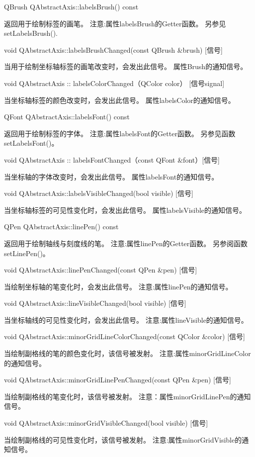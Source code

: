 QBrush QAbstractAxis::labelsBrush() const 

返回用于绘制标签的画笔。 注意:属性labelsBrush的Getter函数。 另参见setLabelsBrush().

void QAbstractAxis::labelsBrushChanged(const QBrush \&brush) [信号] 

当用于绘制坐标轴标签的画笔改变时，会发出此信号。 属性Brush的通知信号。

void QAbstractAxis :: labelsColorChanged（QColor color） [信号signal] 

当坐标轴标签的颜色改变时，会发出此信号。 属性labelsColor的通知信号。

QFont QAbstractAxis::labelsFont() const 

返回用于绘制标签的字体。 注意:属性labelsFont的Getter函数。 另参见函数setLabelsFont()。

void QAbstractAxis :: labelsFontChanged（const QFont \&font）[信号] 

当坐标轴的字体改变时，会发出此信号。 属性labelsFont的通知信号。

void QAbstractAxis::labelsVisibleChanged(bool visible) [信号] 

当坐标轴标签的可见性变化时，会发出此信号。 属性labelsVisible的通知信号。

QPen QAbstractAxis::linePen() const 

返回用于绘制轴线与刻度线的笔。 注意:属性linePen的Getter函数。 另参阅函数setLinePen()。

void QAbstractAxis::linePenChanged(const QPen \&pen) [信号] 

当绘制坐标轴的笔变化时，会发出此信号。 注意:属性linePen的通知信号。

void QAbstractAxis::lineVisibleChanged(bool visible) [信号] 

当坐标轴线的可见性变化时，会发出此信号。 注意:属性lineVisible的通知信号。

void QAbstractAxis::minorGridLineColorChanged(const QColor \&color)
[信号]

 当绘制副格线的笔的颜色变化时，该信号被发射。 注意:属性minorGridLineColor的通知信号。

void QAbstractAxis::minorGridLinePenChanged(const QPen \&pen) [信号] 

当绘制副格线的笔变化时，该信号被发射。 注意：属性minorGridLinePen的通知信号。

void QAbstractAxis::minorGridVisibleChanged(bool visible) [信号] 

当绘制副格线的可见性变化时，该信号被发射。 注意:属性minorGridVisible的通知信号。

